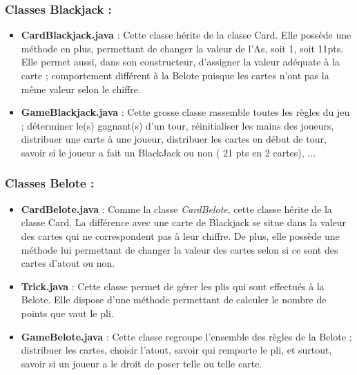 \documentclass[a4paper]{report}
\begin{document}
\subsubsection{Classes Blackjack :}
\begin{itemize}
\item \textbf{CardBlackjack.java} : Cette classe hérite de la classe Card. Elle possède une méthode en plus, permettant de changer la valeur de l'As, soit 1, soit 11pts. Elle permet aussi, dans son constructeur, d'assigner la valeur adéquate à la carte ; comportement différent à la Belote puisque les cartes n'ont pas la même valeur selon le chiffre.
\item \textbf{GameBlackjack.java} : Cette grosse classe rassemble toutes les règles du jeu ; déterminer le(s) gagnant(s) d'un tour, réinitialiser les mains des joueurs, distribuer une carte à une joueur, distribuer les cartes en début de tour, savoir si le joueur a fait un BlackJack ou non ( 21 pts en 2 cartes), ...
\end{itemize}

\subsubsection{Classes Belote :}
\begin{itemize}
	\item \textbf{CardBelote.java} : Comme la classe \textit{CardBelote}, cette classe hérite de la classe Card. La différence avec une carte de Blackjack se situe dans la valeur des cartes qui ne correspondent pas à leur chiffre. De plus, elle possède une méthode lui permettant de changer la valeur des cartes selon si ce sont des cartes d'atout ou non.
	\item \textbf{Trick.java} : Cette classe permet de gérer les plis qui sont effectués à la Belote. Elle dispose d'une méthode permettant de calculer le nombre de points que vaut le pli.
	\item \textbf{GameBelote.java} : Cette classe regroupe l'ensemble des règles de la Belote ; distribuer les cartes, choisir l'atout, savoir qui remporte le pli, et surtout, savoir si un joueur a le droit de poser telle ou telle carte.
\end{itemize}
\end{document}
